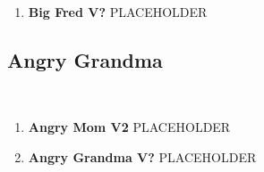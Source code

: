 \begin{enumerate}[]
	\item\label{rt:Big Fred} \colorbox{black!20}{\textbf{Big Fred V?  } }
	\newline PLACEHOLDER\
\end{enumerate}
\subsection*{Angry Grandma}\label{bf:Angry Grandma}
\

\begin{enumerate}[resume]
	\item\label{rt:Angry Mom} \colorbox{green!20}{\textbf{Angry Mom V2  } }
	\newline PLACEHOLDER\
	\item\label{rt:Angry Grandma} \colorbox{black!20}{\textbf{Angry Grandma V?  } }
	\newline PLACEHOLDER\
\end{enumerate}
\clearpage